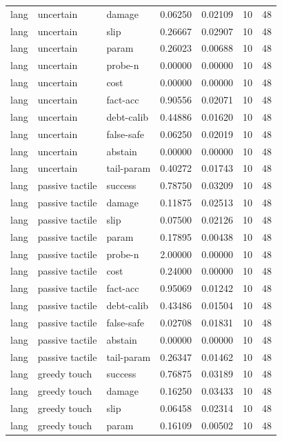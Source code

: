 \documentclass{article}
\begin{document}
\begin{center}
\begin{longtable}{lllllll}
lang & uncertain & damage & 0.06250 & 0.02109 & 10 & 48 \\
lang & uncertain & slip & 0.26667 & 0.02907 & 10 & 48 \\
lang & uncertain & param & 0.26023 & 0.00688 & 10 & 48 \\
lang & uncertain & probe-n & 0.00000 & 0.00000 & 10 & 48 \\
lang & uncertain & cost & 0.00000 & 0.00000 & 10 & 48 \\
lang & uncertain & fact-acc & 0.90556 & 0.02071 & 10 & 48 \\
lang & uncertain & debt-calib & 0.44886 & 0.01620 & 10 & 48 \\
lang & uncertain & false-safe & 0.06250 & 0.02019 & 10 & 48 \\
lang & uncertain & abstain & 0.00000 & 0.00000 & 10 & 48 \\
lang & uncertain & tail-param & 0.40272 & 0.01743 & 10 & 48 \\
lang & passive tactile & success & 0.78750 & 0.03209 & 10 & 48 \\
lang & passive tactile & damage & 0.11875 & 0.02513 & 10 & 48 \\
lang & passive tactile & slip & 0.07500 & 0.02126 & 10 & 48 \\
lang & passive tactile & param & 0.17895 & 0.00438 & 10 & 48 \\
lang & passive tactile & probe-n & 2.00000 & 0.00000 & 10 & 48 \\
lang & passive tactile & cost & 0.24000 & 0.00000 & 10 & 48 \\
lang & passive tactile & fact-acc & 0.95069 & 0.01242 & 10 & 48 \\
lang & passive tactile & debt-calib & 0.43486 & 0.01504 & 10 & 48 \\
lang & passive tactile & false-safe & 0.02708 & 0.01831 & 10 & 48 \\
lang & passive tactile & abstain & 0.00000 & 0.00000 & 10 & 48 \\
lang & passive tactile & tail-param & 0.26347 & 0.01462 & 10 & 48 \\
lang & greedy touch & success & 0.76875 & 0.03189 & 10 & 48 \\
lang & greedy touch & damage & 0.16250 & 0.03433 & 10 & 48 \\
lang & greedy touch & slip & 0.06458 & 0.02314 & 10 & 48 \\
lang & greedy touch & param & 0.16109 & 0.00502 & 10 & 48 \\
\bottomrule
\end{longtable}
\renewcommand{\arraystretch}{1.0}
\end{center}
\end{document}
